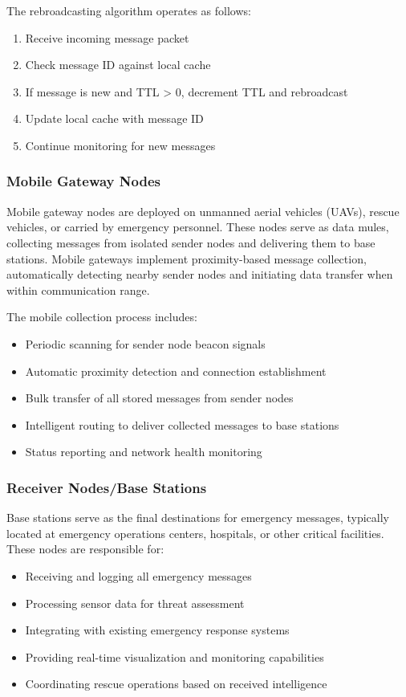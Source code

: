 \documentclass[conference]{IEEEtran}
\begin{document}
The rebroadcasting algorithm operates as follows:
\begin{enumerate}
\item Receive incoming message packet
\item Check message ID against local cache
\item If message is new and TTL > 0, decrement TTL and rebroadcast
\item Update local cache with message ID
\item Continue monitoring for new messages
\end{enumerate}

\subsubsection{Mobile Gateway Nodes}
Mobile gateway nodes are deployed on unmanned aerial vehicles (UAVs), rescue vehicles, or carried by emergency personnel. These nodes serve as data mules, collecting messages from isolated sender nodes and delivering them to base stations. Mobile gateways implement proximity-based message collection, automatically detecting nearby sender nodes and initiating data transfer when within communication range.

The mobile collection process includes:
\begin{itemize}
\item Periodic scanning for sender node beacon signals
\item Automatic proximity detection and connection establishment
\item Bulk transfer of all stored messages from sender nodes
\item Intelligent routing to deliver collected messages to base stations
\item Status reporting and network health monitoring
\end{itemize}

\subsubsection{Receiver Nodes/Base Stations}
Base stations serve as the final destinations for emergency messages, typically located at emergency operations centers, hospitals, or other critical facilities. These nodes are responsible for:

\begin{itemize}
\item Receiving and logging all emergency messages
\item Processing sensor data for threat assessment
\item Integrating with existing emergency response systems
\item Providing real-time visualization and monitoring capabilities
\item Coordinating rescue operations based on received intelligence
\end{itemize}
\end{document}
